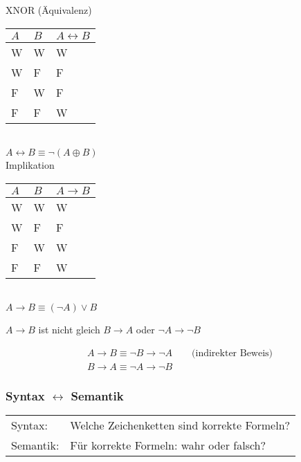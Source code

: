 XNOR (Äquivalenz) \\
\begin{tabular}{ | l | l | l | }
	\hline
	$A$	& $B$	& $A \leftrightarrow B$	\\ \hline
	W	& W		& W					\\ \hline
	W	& F		& F					\\ \hline
	F	& W		& F					\\ \hline
	F	& F		& W					\\ \hline
\end{tabular} \\
$A \leftrightarrow B \equiv \neg ( A \oplus B )$ \\
Implikation \\
\begin{tabular}{ | l | l | l | }
	\hline
	$A$	& $B$	& $A \rightarrow B$	\\ \hline
	W	& W		& W			\\ \hline
	W	& F		& F			\\ \hline
	F	& W		& W			\\ \hline
	F	& F		& W			\\ \hline
\end{tabular} \\
$A \rightarrow B \equiv ( \neg A ) \vee B$ \\
\begin{bem}
	$A \rightarrow B$ ist nicht gleich $ B \rightarrow A$ oder $\neg A \rightarrow \neg B$
\end{bem}
\begin{gather*}
	A \rightarrow B \equiv \neg B \rightarrow \neg A \qquad \text{(indirekter Beweis)} \\
	B \rightarrow A \equiv \neg A \rightarrow \neg B
\end{gather*}
\subsubsection{Syntax \texorpdfstring{$\leftrightarrow$}{<->} Semantik}
\begin{tabular}{ l l }
	Syntax:	& Welche Zeichenketten sind korrekte Formeln? \\
	Semantik:	& Für korrekte Formeln: wahr oder falsch?
\end{tabular}
